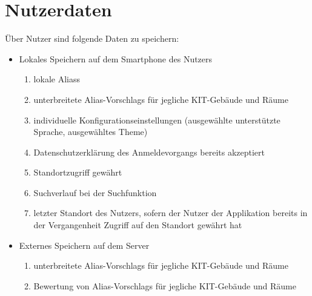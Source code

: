 \section{Nutzerdaten}

Über Nutzer sind folgende Daten zu speichern:
\begin{itemize}
	\item Lokales Speichern auf dem Smartphone des Nutzers
	\begin{enumerate}[label=\textbf{/D\arabic*0/}, align=left]
		\item \gls{lokal}e \Glspl{Alias}
		\item unterbreitete \Glspl{Alias-Vorschlag} für jegliche \Gls{KIT}-Gebäude und Räume
		\item individuelle Konfigurationseinstellungen (ausgewählte unterstützte Sprache, ausgewähltes \Gls{Theme})
		\item Datenschutzerklärung des Anmeldevorgangs bereits akzeptiert
		\item Standortzugriff gewährt
		\item Suchverlauf bei der Suchfunktion
		\item letzter Standort des Nutzers, sofern der Nutzer der Applikation bereits in der Vergangenheit Zugriff auf den Standort gewährt hat
	\end{enumerate}
	\item Externes Speichern auf dem Server
	\begin{enumerate}[label=\textbf{/D\arabic*0/}, align=left, resume]
		\item unterbreitete \Glspl{Alias-Vorschlag} für jegliche \Gls{KIT}-Gebäude und Räume
		\item Bewertung von \Glspl{Alias-Vorschlag} für jegliche \Gls{KIT}-Gebäude und Räume
		\setcounter{user_data_end}{\value{enumi}}
	\end{enumerate}
\end{itemize}
